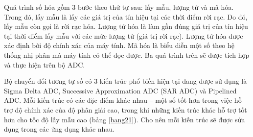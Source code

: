 Quá trình số hóa gồm 3 bước theo thứ tự sau: lấy mẫu, lượng tử và mã hóa. Trong đó, lấy mẫu là lấy các giá trị của tín hiệu tại các thời điểm rời rạc. Do đó, lấy mẫu còn gọi là rời rạc hóa. Lượng tử hóa là làm gần đúng giá trị của tín hiệu tại thời điểm lấy mẫu với các mức lượng tử (giá trị rời rạc). Lượng tử hóa được xác định bởi độ chính xác của máy tính. Mã hóa là biểu diễn một số theo hệ thống nhị phân mà máy tính có thể đọc được\cite{xulytinhieusobook}. Ba quá trình trên sẽ được tích hợp và thực hiện trên bộ ADC.

Bộ chuyển đổi tương tự số có 3 kiến trúc phổ biến hiện tại đang được sử dụng là 
Sigma Delta ADC, Successive Approximation ADC (SAR ADC) và Pipelined ADC.
Mỗi kiến trúc có các đặc điểm khác nhau – một số tốt hơn trong việc hỗ trợ độ chính xác của độ phân giải cao, trong khi những kiến trúc khác hỗ trợ tốt hơn cho tốc độ lấy mẫu cao (bảng \ref{bang21}). Cho nên mỗi kiến trúc sẽ được sửa dụng trong các ứng dụng khác nhau.
